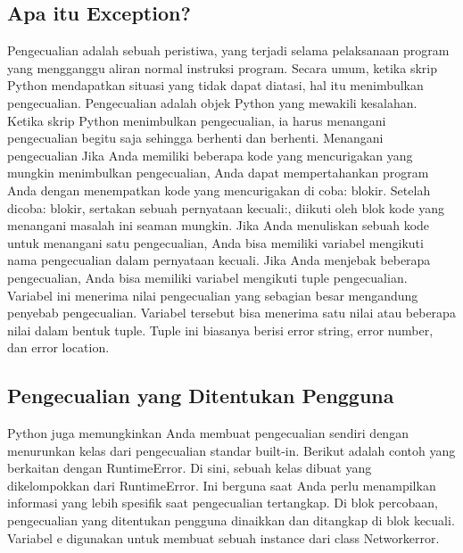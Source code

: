 \subsection{Apa itu Exception?}
Pengecualian adalah sebuah peristiwa, yang terjadi selama pelaksanaan program yang mengganggu aliran normal instruksi program. Secara umum, ketika skrip Python mendapatkan situasi yang tidak dapat diatasi, hal itu menimbulkan pengecualian. Pengecualian adalah objek Python yang mewakili kesalahan. Ketika skrip Python menimbulkan pengecualian, ia harus menangani pengecualian begitu saja sehingga berhenti dan berhenti. Menangani pengecualian 
Jika Anda memiliki beberapa kode yang mencurigakan yang mungkin menimbulkan pengecualian, Anda dapat mempertahankan program Anda dengan menempatkan kode yang mencurigakan di coba: blokir. Setelah dicoba: blokir, sertakan sebuah pernyataan kecuali:, diikuti oleh blok kode yang menangani masalah ini seaman mungkin.
Jika Anda menuliskan sebuah kode untuk menangani satu pengecualian, Anda bisa memiliki variabel mengikuti nama pengecualian dalam pernyataan kecuali. Jika Anda menjebak beberapa pengecualian, Anda bisa memiliki variabel mengikuti tuple pengecualian.
Variabel ini menerima nilai pengecualian yang sebagian besar mengandung penyebab pengecualian. Variabel tersebut bisa menerima satu nilai atau beberapa nilai dalam bentuk tuple. Tuple ini biasanya berisi error string, error number, dan error location.

\subsection{Pengecualian yang Ditentukan Pengguna}
Python juga memungkinkan Anda membuat pengecualian sendiri dengan menurunkan kelas dari pengecualian standar built-in.
Berikut adalah contoh yang berkaitan dengan RuntimeError. Di sini, sebuah kelas dibuat yang dikelompokkan dari RuntimeError. Ini berguna saat Anda perlu menampilkan informasi yang lebih spesifik saat pengecualian tertangkap.
Di blok percobaan, pengecualian yang ditentukan pengguna dinaikkan dan ditangkap di blok kecuali. Variabel e digunakan untuk membuat sebuah instance dari class Networkerror.

